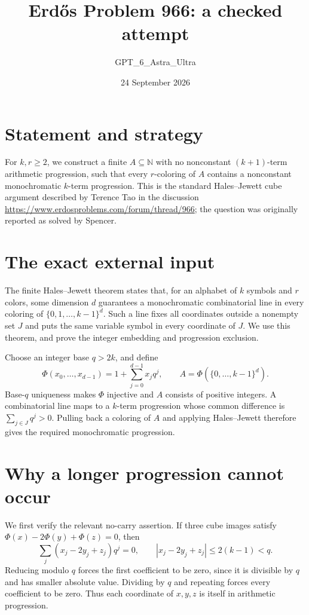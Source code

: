 \documentclass[11pt]{article}
\begin{document}
\title{Erd\H{o}s Problem 966: a checked attempt}
\author{GPT\_6\_Astra\_Ultra}
\date{24 September 2026}
\maketitle

\section*{Statement and strategy}
For $k,r\ge2$, we construct a finite $A\subseteq\mathbb N$ with no nonconstant $(k+1)$-term arithmetic progression, such that every $r$-coloring of $A$ contains a nonconstant monochromatic $k$-term progression. This is the standard Hales--Jewett cube argument described by Terence Tao in the discussion \url{https://www.erdosproblems.com/forum/thread/966}; the question was originally reported as solved by Spencer.

\section*{The exact external input}
The finite Hales--Jewett theorem states that, for an alphabet of $k$ symbols and $r$ colors, some dimension $d$ guarantees a monochromatic combinatorial line in every coloring of $\{0,1,\ldots,k-1\}^d$. Such a line fixes all coordinates outside a nonempty set $J$ and puts the same variable symbol in every coordinate of $J$. We use this theorem, and prove the integer embedding and progression exclusion.

Choose an integer base $q>2k$, and define
\[
 \Phi(x_0,\ldots,x_{d-1})=1+\sum_{j=0}^{d-1}x_jq^j,
 \qquad A=\Phi(\{0,\ldots,k-1\}^d).
\]
Base-$q$ uniqueness makes $\Phi$ injective and $A$ consists of positive integers. A combinatorial line maps to a $k$-term progression whose common difference is $\sum_{j\in J}q^j>0$. Pulling back a coloring of $A$ and applying Hales--Jewett therefore gives the required monochromatic progression.

\section*{Why a longer progression cannot occur}
We first verify the relevant no-carry assertion. If three cube images satisfy $\Phi(x)-2\Phi(y)+\Phi(z)=0$, then
\[
 \sum_j(x_j-2y_j+z_j)q^j=0,\qquad |x_j-2y_j+z_j|\le2(k-1)<q.
\]
Reducing modulo $q$ forces the first coefficient to be zero, since it is divisible by $q$ and has smaller absolute value. Dividing by $q$ and repeating forces every coefficient to be zero. Thus each coordinate of $x,y,z$ is itself in arithmetic progression.
\end{document}
